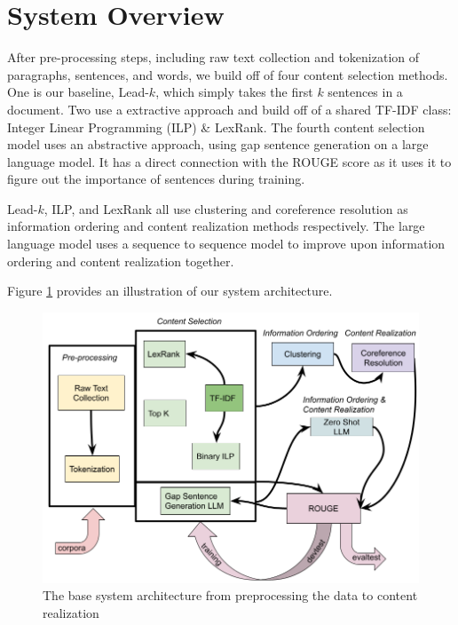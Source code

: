 
\section{System Overview}

After pre-processing steps, including raw text collection and tokenization of paragraphs, sentences, and words, we build off of four content selection methods. One is our baseline, Lead-$k$, which simply takes the first $k$ sentences in a document. Two use a extractive approach and build off of a shared TF-IDF class: Integer Linear Programming (ILP) \& LexRank. The fourth content selection model uses an abstractive approach, using gap sentence generation on a large language model. It has a direct connection with the ROUGE score as it uses it to figure out the importance of sentences during training.

Lead-$k$, ILP, and LexRank all use clustering and coreference resolution as information ordering and content realization methods respectively. The large language model uses a sequence to sequence model to improve upon information ordering and content realization together.

Figure \ref{SystemArchitecture} provides an illustration of our system architecture.

\begin{figure}[h]
    \centering
    \includegraphics[scale=0.24]{D5_ System Architecture.png}
    \caption{The base system architecture from preprocessing the data to content realization}
    \label{SystemArchitecture}
\end{figure}